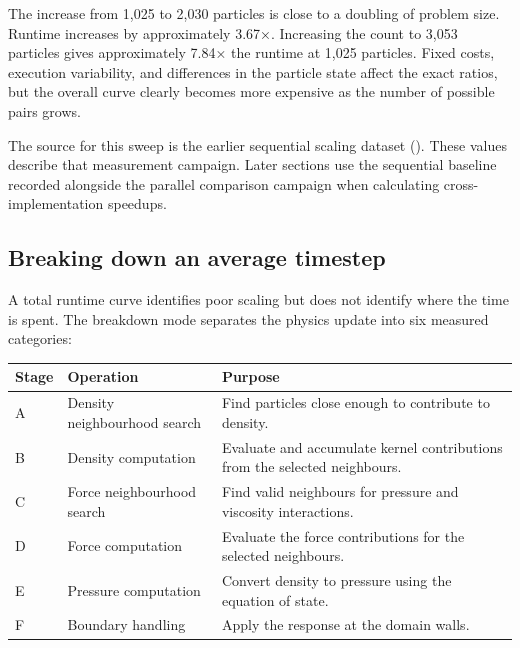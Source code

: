\documentclass[
  11pt,
]{article}
\newcounter{none} %
\begin{document}
The increase from 1,025 to 2,030 particles is close to a doubling of
problem size. Runtime increases by approximately 3.67×. Increasing the
count to 3,053 particles gives approximately 7.84× the runtime at 1,025
particles. Fixed costs, execution variability, and differences in the
particle state affect the exact ratios, but the overall curve clearly
becomes more expensive as the number of possible pairs grows.

The source for this sweep is the earlier sequential scaling dataset
(). These values describe
that measurement campaign. Later sections use the sequential baseline
recorded alongside the parallel comparison campaign when calculating
cross-implementation speedups.

\subsection{Breaking down an average
timestep}\label{breaking-down-an-average-timestep}

A total runtime curve identifies poor scaling but does not identify
where the time is spent. The breakdown mode separates the physics update
into six measured categories:

{\def\LTcaptype{none} %
\begin{longtable}[]{@{}
  >{\raggedright\arraybackslash}p{}
  >{\raggedright\arraybackslash}p{}
  >{\raggedright\arraybackslash}p{}@{}}
\toprule\noalign{}
\begin{minipage}[b]{\linewidth}\raggedright
Stage
\end{minipage} & \begin{minipage}[b]{\linewidth}\raggedright
Operation
\end{minipage} & \begin{minipage}[b]{\linewidth}\raggedright
Purpose
\end{minipage} \\
\midrule\noalign{}
\endhead
\bottomrule\noalign{}
\endlastfoot
A & Density neighbourhood search & Find particles close enough to
contribute to density. \\
B & Density computation & Evaluate and accumulate kernel contributions
from the selected neighbours. \\
C & Force neighbourhood search & Find valid neighbours for pressure and
viscosity interactions. \\
D & Force computation & Evaluate the force contributions for the
selected neighbours. \\
E & Pressure computation & Convert density to pressure using the
equation of state. \\
F & Boundary handling & Apply the response at the domain walls. \\
\end{longtable}
}
\end{document}
